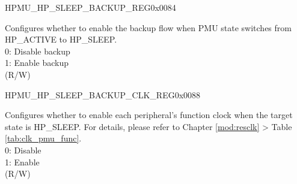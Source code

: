 \begin{register}{H}{PMU\_HP\_SLEEP\_BACKUP\_REG}{0x0084}
\begin{regdesc}
\begin{reglist}
\label{fielddesc:PMUHPACTIVE2SLEEPBACKUPEN}\item [PMU\_HP\_ACTIVE2SLEEP\_BACKUP\_EN] Configures whether to enable the backup flow when PMU state switches from HP\_ACTIVE to HP\_SLEEP. \\
0: Disable backup\\
1: Enable backup\\
(R/W)
\end{reglist}\end{regdesc}
\end{register}


\begin{register}{H}{PMU\_HP\_SLEEP\_BACKUP\_CLK\_REG}{0x0088}\label{regdesc:PMUHPSLEEPBACKUPCLKREG}
%
\regnewline%
\begin{regdesc}\begin{reglist}
\label{fielddesc:PMUHPSLEEPBACKUPICGFUNCEN}\item [PMU\_HP\_SLEEP\_BACKUP\_ICG\_FUNC\_EN] Configures whether to enable each peripheral's function clock when the target state is HP\_SLEEP. For details, please refer to Chapter \ref{mod:resclk} \textit{} > Table \ref{tab:clk_pmu_func}.\\
0: Disable\\
1: Enable\\
(R/W)

\end{reglist}\end{regdesc}
\end{register}


